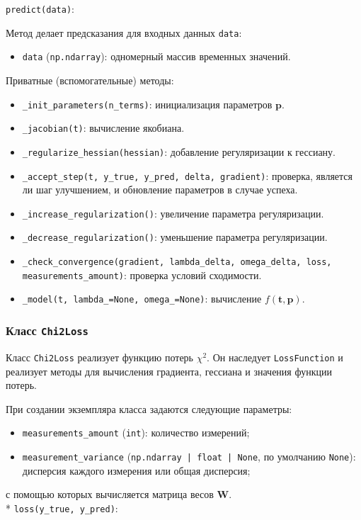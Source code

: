 \texttt{predict(data)}:

Метод делает предсказания для входных данных \texttt{data}:
\begin{itemize}
	\item \texttt{data} (\texttt{np.ndarray}): одномерный массив временных значений.
\end{itemize}

Приватные (вспомогательные) методы:

\begin{itemize}
	\item \texttt{\_init\_parameters(n\_terms)}: инициализация параметров $\mathbf{p}$.
	\item \texttt{\_jacobian(t)}: вычисление якобиана.
	\item \texttt{\_regularize\_hessian(hessian)}: добавление регуляризации к гессиану.
	\item \texttt{\_accept\_step(t, y\_true, y\_pred, delta, gradient)}: проверка, является ли шаг улучшением, и обновление параметров в случае успеха.
	\item \texttt{\_increase\_regularization()}: увеличение параметра регуляризации.
	\item \texttt{\_decrease\_regularization()}: уменьшение параметра регуляризации.
	\item \texttt{\_check\_convergence(gradient, lambda\_delta, omega\_delta, loss, measurements\_amount)}: проверка условий сходимости.
	\item \texttt{\_model(t, lambda\_=None, omega\_=None)}: вычисление $f(\mathbf{t}, \mathbf{p})$.
\end{itemize}


\subsubsection{Класс \texttt{Chi2Loss}}

Класс \texttt{Chi2Loss} реализует функцию потерь $\chi^2$. Он наследует \linebreak \texttt{LossFunction} и реализует методы для вычисления градиента, гессиана и значения функции потерь.

При создании экземпляра класса задаются следующие параметры:
\begin{itemize}
	\item \texttt{measurements\_amount} (\texttt{int}): количество измерений;
	\item \texttt{measurement\_variance} (\texttt{np.ndarray | float | None},  по умолчанию \texttt{None}): дисперсия каждого измерения или общая дисперсия;
\end{itemize}
с помощью которых вычисляется матрица весов $\mathbf{W}$.
\\*
\texttt{loss(y\_true, y\_pred)}:

